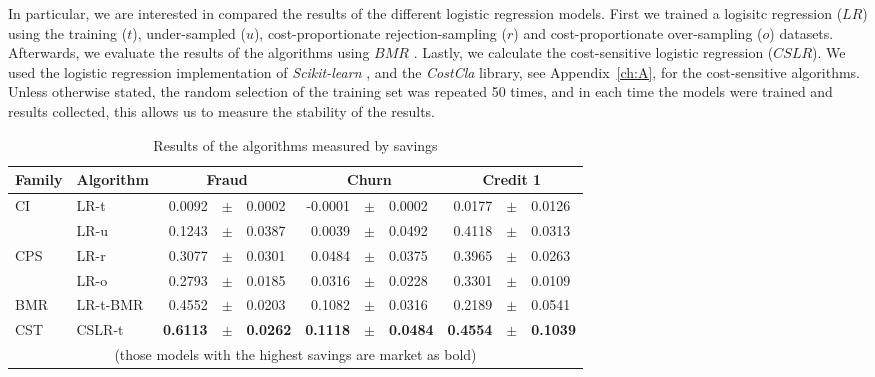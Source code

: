 In particular, we are interested in compared the results of the different logistic regression 
models. First we trained a logisitc regression ($LR$) using the training ($t$), under-sampled 
($u$), cost-proportionate rejection-sampling  ($r$) \citep{Zadrozny2003}  and  cost-proportionate 
over-sampling ($o$) \citep{Elkan2001} datasets. Afterwards,  we evaluate the results of  the 
algorithms using $BMR$ \citep{CorreaBahnsen2014}. Lastly, we calculate the cost-sensitive 
logistic  regression ($CSLR$). We used the logistic regression implementation of
\textit{Scikit-learn} \citep{Pedregosa2011}, and the \textit{CostCla} library, see 
Appendix~\ref{ch:A}, for the cost-sensitive algorithms. Unless otherwise stated, the random 
selection of the training set was repeated 50 times, and in each time the models were trained and 
results collected, this allows us to measure the stability of the results.


\begin{table}
    \centering
    \footnotesize
    \begin{tabular}{l l r@{\hskip 0in}c@{\hskip 0in}l r@{\hskip 0in}c@{\hskip 0in}l r@{\hskip 
    0in}c@{\hskip 0in}l  } %
    \hline
    \bf{Family} & \bf{Algorithm} & \multicolumn{3}{c}{\bf{Fraud}} & 
    \multicolumn{3}{c}{\bf{Churn}} & \multicolumn{3}{c}{\bf{Credit 1}} \\ 
    \hline
CI&LR-t & 0.0092 &$\pm$& 0.0002 & -0.0001 &$\pm$& 0.0002 & 0.0177 &$\pm$& 0.0126\\ 
&LR-u & 0.1243 &$\pm$& 0.0387 & 0.0039 &$\pm$& 0.0492 & 0.4118 &$\pm$& 0.0313\\ 
\hline 
CPS&LR-r & 0.3077 &$\pm$& 0.0301 & 0.0484 &$\pm$& 0.0375 & 0.3965 &$\pm$& 0.0263\\ 
&LR-o & 0.2793 &$\pm$& 0.0185 & 0.0316 &$\pm$& 0.0228 & 0.3301 &$\pm$& 0.0109\\ 
\hline 
BMR&LR-t-BMR & 0.4552 &$\pm$& 0.0203 & 0.1082 &$\pm$& 0.0316 & 0.2189 &$\pm$& 0.0541\\ 
\hline 
CST&CSLR-t & \bf{0.6113} &\bf{$\pm$}& \bf{0.0262} & \bf{0.1118} &\bf{$\pm$}& \bf{0.0484} & 
\bf{0.4554} &\bf{$\pm$}& \bf{0.1039}\\ 
\hline
  \multicolumn{11}{c}{(those models with the highest savings are market as bold)}
  \end{tabular}
    \caption{Results of the algorithms measured by savings}
    \label{tab:7:results_savings}
  \end{table}
  
